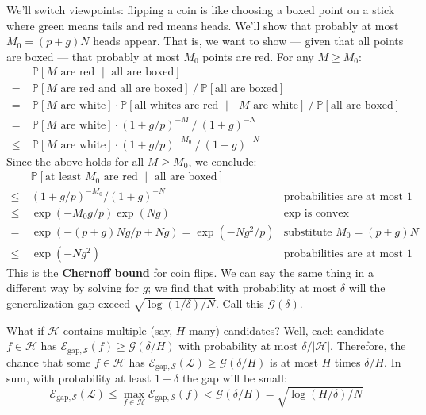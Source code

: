 \documentclass{article}
\newcommand{\PP}{\mathbb{P}}
\newcommand{\Ee}{\mathcal{E}}
\newcommand{\Gg}{\mathcal{G}}
\newcommand{\Hh}{\mathcal{H}}
\newcommand{\Ll}{\mathcal{L}}
\newcommand{\Ss}{\mathcal{S}}
\begin{document}
            We'll switch viewpoints: flipping a coin is like choosing a boxed
            point on a stick where green means tails and red means heads.
            We'll show that probably at most $M_0 = (p+g)N$ heads
            appear.  That is, we want to show --- given that all points are
            boxed --- that probably at most $M_0$ points are red. 
            For any $M\geq M_0$:
            \begin{align*}
                    & ~ \PP[\text{$M$ are red $\mid$ all are boxed}] \\
                  = & ~ \PP[\text{$M$ are red and all are boxed}] ~/~ 
                        \PP[\text{all are boxed}]  \\
                  = & ~ \PP[\text{$M$ are white}] \cdot
                        \PP[\text{all whites are red $\mid$ $M$ are white}] ~/~
                        \PP[\text{all are boxed}] \\
                  = & ~ \PP[\text{$M$ are white}] \cdot (1+g/p)^{-M} ~/~ (1+g)^{-N}  \\
                \leq& ~ \PP[\text{$M$ are white}] \cdot (1+g/p)^{-M_0} ~/~ (1+g)^{-N} 
            \end{align*}
            Since the above holds for all $M\geq M_0$, we conclude:
            \begin{align*}
                ~   & ~ \PP[\text{at least $M_0$ are red $\mid$ all are boxed}] & \\
                \leq& ~ (1+g/p)^{-M_0} / (1+g)^{-N}             & \text{probabilities are at most $1$} \\
                \leq& ~ \exp(-M_0 g/p) \exp(Ng)                 & \text{$\exp$ is convex} \\ 
                =   & ~ \exp(-(p+g)N g/p + Ng) = \exp(-Ng^2/p)  & \text{substitute $M_0=(p+g)N$} \\ 
                \leq& ~ \exp(-Ng^2)                             & \text{probabilities are at most $1$}
            \end{align*}
            This is the \textbf{Chernoff bound} for coin flips.  We can say the
            same thing in a different way by solving for $g$; we find that with
            probability at most $\delta$ will the generalization gap exceed
            $\sqrt{\log(1/\delta)/N}$.  Call this $\Gg(\delta)$.

            What if $\Hh$ contains multiple (say, $H$ many) candidates?
            Well, each candidate $f\in \Hh$ has
            $
                \Ee_{\text{gap},\Ss}(f) \geq \Gg(\delta/H)
            $
            with probability at most $\delta/|\Hh|$.  Therefore, the chance
            that some $f\in \Hh$ has
            $
                \Ee_{\text{gap},\Ss}(\Ll) \geq \Gg(\delta/H)
            $
            is at most $H$ times $\delta/H$.  In sum,
            with probability at least $1-\delta$ the gap will be small:
            $$
                \Ee_{\text{gap},\Ss}(\Ll)
                    \leq \max_{f\in\Hh} \Ee_{\text{gap}, \Ss}(f)
                    < \Gg(\delta/H)
                    = \sqrt{\log(H/\delta)/N}
            $$
\end{document}
